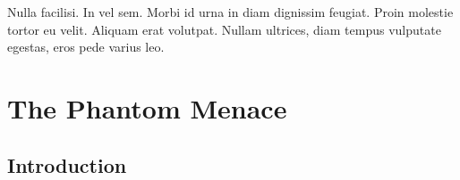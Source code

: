 \graphicspath{{figures/chapter-2/}}


\begin{savequote}[75mm]
Nulla facilisi. In vel sem. Morbi id urna in diam dignissim feugiat. Proin molestie tortor eu velit. Aliquam erat volutpat. Nullam ultrices, diam tempus vulputate egestas, eros pede varius leo.
\end{savequote}

\chapter{The Phantom Menace}


\section{Introduction}

\lipsum[1-4] 
\cite{Lorch1969}


